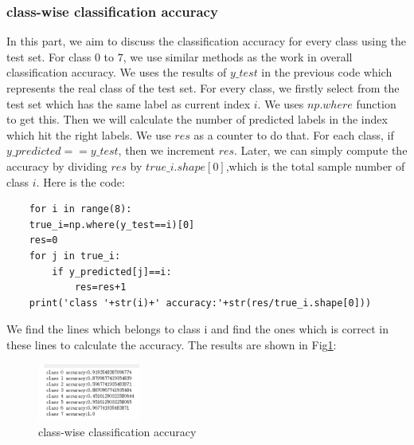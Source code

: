 \documentclass[conference]{IEEEtran}
\begin{document}
\subsubsection{class-wise classification accuracy}
In this part, we aim to discuss the classification accuracy for every class using the test set. 
For class $0$ to $7$, we use similar methods as the work in overall classification accuracy. 
We uses the results of $y\_test$ in the previous code which represents the real class of the test set. For every class, we firstly select from the test set which has the same label as current index $i$.
We uses $np.where$ function to get this. Then we will calculate the number of predicted labels in the index which hit the right labels. We use $res$ as a counter to do that.
For each class, if $y\_predicted == y\_test$, then we increment $res$.
Later, we can simply compute the accuracy by dividing $res$ by $true\_i.shape[0]$,which is the total sample number of class $i$.
Here is the code:
\begin{lstlisting}
    for i in range(8):
    true_i=np.where(y_test==i)[0]
    res=0
    for j in true_i:
        if y_predicted[j]==i:
            res=res+1
    print('class '+str(i)+' accuracy:'+str(res/true_i.shape[0]))
\end{lstlisting}
We find the lines which belongs to class i and find the ones which is correct in these lines to calculate the accuracy. The results are shown in Fig\ref{Fig.t3q2}:
\begin{figure}[h] 
    \centering
    \includegraphics[width=0.3\textwidth]{T3Q1b.png}
    \caption{class-wise classification accuracy} 
    \label{Fig.t3q2} 
\end{figure}
\end{document}
